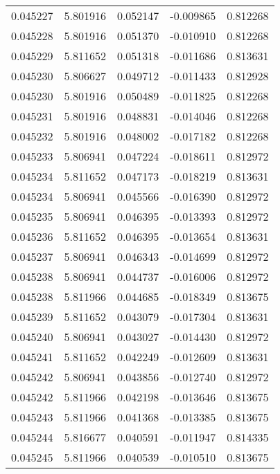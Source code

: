 \begin{tabular}{lrrrr}
0.045227    &  5.801916 &  0.052147 & -0.009865 &             0.812268 \\
0.045228    &  5.801916 &  0.051370 & -0.010910 &             0.812268 \\
0.045229    &  5.811652 &  0.051318 & -0.011686 &             0.813631 \\
0.045230    &  5.806627 &  0.049712 & -0.011433 &             0.812928 \\
0.045230    &  5.801916 &  0.050489 & -0.011825 &             0.812268 \\
0.045231    &  5.801916 &  0.048831 & -0.014046 &             0.812268 \\
0.045232    &  5.801916 &  0.048002 & -0.017182 &             0.812268 \\
0.045233    &  5.806941 &  0.047224 & -0.018611 &             0.812972 \\
0.045234    &  5.811652 &  0.047173 & -0.018219 &             0.813631 \\
0.045234    &  5.806941 &  0.045566 & -0.016390 &             0.812972 \\
0.045235    &  5.806941 &  0.046395 & -0.013393 &             0.812972 \\
0.045236    &  5.811652 &  0.046395 & -0.013654 &             0.813631 \\
0.045237    &  5.806941 &  0.046343 & -0.014699 &             0.812972 \\
0.045238    &  5.806941 &  0.044737 & -0.016006 &             0.812972 \\
0.045238    &  5.811966 &  0.044685 & -0.018349 &             0.813675 \\
0.045239    &  5.811652 &  0.043079 & -0.017304 &             0.813631 \\
0.045240    &  5.806941 &  0.043027 & -0.014430 &             0.812972 \\
0.045241    &  5.811652 &  0.042249 & -0.012609 &             0.813631 \\
0.045242    &  5.806941 &  0.043856 & -0.012740 &             0.812972 \\
0.045242    &  5.811966 &  0.042198 & -0.013646 &             0.813675 \\
0.045243    &  5.811966 &  0.041368 & -0.013385 &             0.813675 \\
0.045244    &  5.816677 &  0.040591 & -0.011947 &             0.814335 \\
0.045245    &  5.811966 &  0.040539 & -0.010510 &             0.813675 \\

\end{tabular}
